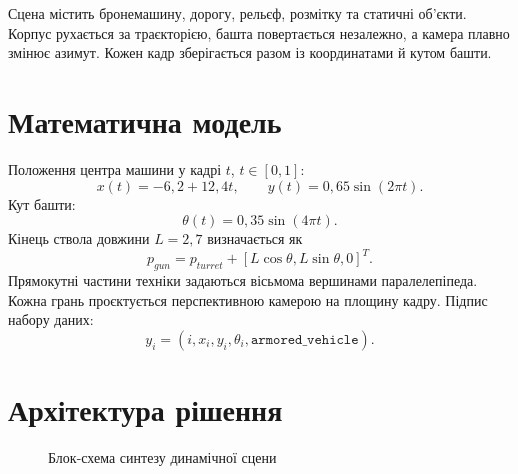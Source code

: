 \documentclass[12pt,a4paper]{article}
\begin{document}
Сцена містить бронемашину, дорогу, рельєф, розмітку та статичні об'єкти. Корпус рухається за траєкторією, башта повертається незалежно, а камера плавно змінює азимут. Кожен кадр зберігається разом із координатами й кутом башти.

\section{Математична модель}
Положення центра машини у кадрі $t$, $t\in[0,1]$:
\begin{equation}x(t)=-6{,}2+12{,}4t,\qquad y(t)=0{,}65\sin(2\pi t).\end{equation}
Кут башти:
\begin{equation}\theta(t)=0{,}35\sin(4\pi t).\end{equation}
Кінець ствола довжини $L=2{,}7$ визначається як
\begin{equation}p_{gun}=p_{turret}+[L\cos\theta,L\sin\theta,0]^T.\end{equation}
Прямокутні частини техніки задаються вісьмома вершинами паралелепіпеда. Кожна грань проєктується перспективною камерою на площину кадру. Підпис набору даних:
\begin{equation}y_i=(i,x_i,y_i,\theta_i,\texttt{armored\_vehicle}).\end{equation}

\section{Архітектура рішення}
\begin{figure}[H]\centering
{}\caption{Блок-схема синтезу динамічної сцени}
\end{figure}
\end{document}
